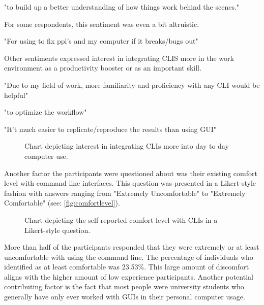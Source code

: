\begin{quotes}
	"to build up a better understanding of how things work behind the scenes."
\end{quotes}

For some respondents, this sentiment was even a bit altruistic.

\begin{quotes}
	"For using to fix ppl's and my computer if it breaks/bugs out"
\end{quotes}

Other sentiments expressed interest in integrating CLIS more in the work
environment as a productivity booster or as an important skill.


\begin{quotes}
	"Due to my field of work, more familiarity and proficiency with any CLI would be helpful"
\end{quotes}

\begin{quotes}
	"to optimize the workflow"
\end{quotes}

\begin{quotes}
	"It't much easier to replicate/reproduce the results than using GUI"
\end{quotes}

\begin{figure}[htbp]
	\scalebox{0.65}{}
	\caption{Chart depicting interest in integrating CLIs more into day to day computer use.}
	\label{fig:daytoday}
\end{figure}

Another factor the participants were questioned about was their existing
comfort level with command line interfaces. This question was presented in a
Likert-style fashion with answers ranging from "Extremely Uncomfortable" to
"Extremely Comfortable" (see: \autoref{fig:comfortlevel}).

\begin{figure}[H]
	\scalebox{0.72}{}
	\caption{Chart depicting the self-reported comfort level with CLIs in a Likert-style question.}
	\label{fig:comfortlevel}
\end{figure}

More than half of the participants responded that they were extremely or at
least uncomfortable with using the command line. The percentage of individuals
who identified as at least comfortable was 23.53\%. This large amount of
discomfort aligns with the higher amount of low experience participants.
Another potential contributing factor is the fact that most people were
university students who generally have only ever worked with GUIs in their
personal computer usage.

